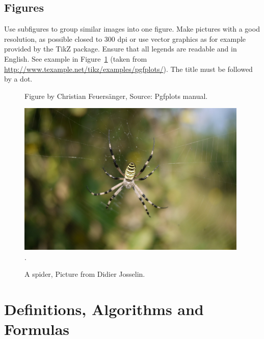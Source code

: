 \documentclass{jimis-en}
\begin{document}
\subsection{Figures}

Use subfigures to group similar images into one figure. Make pictures with a good resolution, as possible closed to 300 dpi or use vector graphics as for example provided by the TikZ package. Ensure that all legends are readable and in English. See example in Figure~\ref{fig:example} (taken from \url{http://www.texample.net/tikz/examples/pgfplots/}). The title must be followed by a dot.

\begin{figure}
  \centering
  \caption{Figure by Christian Feuers\"anger, Source: Pgfplots manual.}
  \label{fig:example}
\end{figure}

\begin{figure}[ht] 
\resizebox{10cm}{7cm}
  {\includegraphics[width=11cm]{spider.jpg}}
  \centering
  \label{frog}
.  \caption{A spider, Picture from Didier Josselin.}
  \end{figure}
  
\section{Definitions, Algorithms and Formulas}
\end{document}
